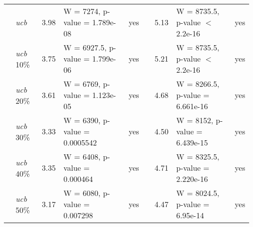 \documentclass[graybox]{sty/svmult}
\begin{document}
\begin{table*}
\begin{tiny}
\begin{center}
\begin{tabular}{|l| l c l c |c| c l c|}
& \emph{ucb}                         &  3.98   & W = 7274, p-value = 1.789e-08          & yes & &  5.13                & W = 8735.5, p-value $<$ 2.2e-16            & yes \\
& \emph{ucb} 10\%                    &  3.75   & W = 6927.5, p-value = 1.799e-06        & yes & &  5.21                & W = 8735.5, p-value $<$ 2.2e-16            & yes\\
& \emph{ucb} 20\%                    &  3.61   & W = 6769, p-value = 1.123e-05          & yes & &  4.68                & W = 8266.5, p-value = 6.661e-16          & yes \\
& \emph{ucb} 30\%                    &  3.33   & W = 6390, p-value = 0.0005542          & yes & &  4.50                & W = 8152, p-value = 6.439e-15            & yes \\
& \emph{ucb} 40\%                    &  3.35   & W = 6408, p-value = 0.000464           & yes & &  4.71                & W = 8325.5, p-value = 2.220e-16          & yes \\
& \emph{ucb} 50\%                    &  3.17   & W = 6080, p-value = 0.007298           & yes & &  4.47                & W = 8024.5, p-value = 6.95e-14           & yes \\ [1ex]
 

\end{tabular}
\end{center}
\end{tiny}
\end{table*}
\end{document}
